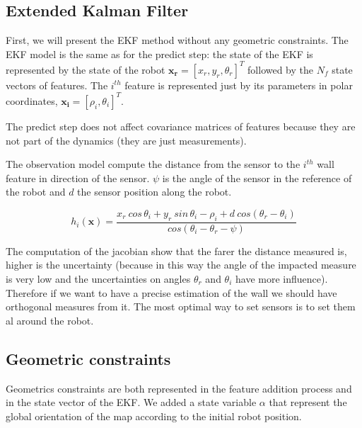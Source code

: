 \documentclass[a4paper,12pt]{article}
\begin{document}
\subsection{Extended Kalman Filter}
\label{sec:EKF}

First, we will present the EKF method without any geometric constraints.
The EKF model is the same as \cite{zunino2001simultaneous} for the predict step: the state of the EKF is represented by the state of the robot $\mathbf{x_r} = \left [x_r,y_r,\theta_r \right ]^T$ followed by the $N_f$ state vectors of features.
The $i^{th}$ feature is represented just by its parameters in polar coordinates, $\mathbf{x_i} = [\rho_i, \theta_i]^T$.

The predict step does not affect covariance matrices of features because they are not part of the dynamics (they are just measurements).

The observation model compute the distance from the sensor to the $i^{th}$ wall feature in direction of the sensor. $\psi$ is the angle of the sensor in the reference of the robot and $d$ the sensor position along the robot.

\begin{equation}
h_i(\mathbf{x}) =\frac{ x_r \: cos \, \theta_i + y_r \: sin \, \theta_i - \rho_i + d\: cos(\theta_r-\theta_i)}{cos(\theta_i-\theta_r-\psi)} 
\end{equation}


The computation of the jacobian show that the farer the distance measured is, higher is the uncertainty (because in this way the angle of the impacted measure is very low and the uncertainties on angles $\theta_r$ and $\theta_i$ have more influence).
Therefore if we want to have a precise estimation of the wall we should have orthogonal measures from it. The most optimal way to set sensors is to set them al around the robot.

\subsection{Geometric constraints}
\label{sec:geom}

Geometrics constraints are both represented in the feature addition process and in the state vector of the EKF.
We added a state variable $\alpha$ that represent the global orientation of the map according to the initial robot position.

\end{document}
